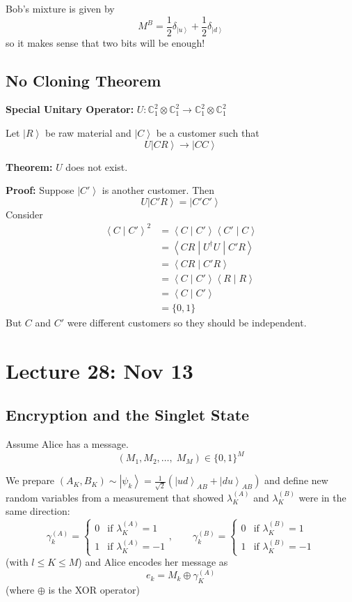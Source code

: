 \documentclass[12pt]{article}
\newcommand{\brak}[1]{\left\langle #1 \right\rangle}
\newcommand{\C}{\mathbb{C}}
\newcommand{\ket}[1]{\left\vert #1 \right\rangle}
\begin{document}
        Bob's mixture is given by 
        \[M^B = \frac{1}{2}\delta_{\ket{u}} + \frac{1}{2}\delta_{\ket{d}}\]
        so it makes sense that two bits will be enough!

    \subsection*{No Cloning Theorem}
        \textbf{Special Unitary Operator:} $U: \C_1^2 \otimes \C_1^2 \to \C_1^2 \otimes \C_1^2$
            
            Let $\ket{R}$ be raw material and $\ket{C}$ be a customer such that
            \[U\ket{CR} \to \ket{CC}\]

        \textbf{Theorem:} $U$ does not exist. 

        \textbf{Proof:} Suppose $\ket{C'}$ is another customer. Then 
        \[U\ket{C'R} = \ket{C'C'}\]
        Consider 
        \begin{align*}
            \brak{C \; | \; C'}^2 &= \brak{C \; | \; C'}\brak{C' \; | \; C}\\
            &= \brak{CR \; | \; U^\dagger U \; | \; C'R}\\
            &= \brak{CR \; | \;  C'R}\\
            &= \brak{C \; | \; C'}\brak{R \; | \; R}\\
            &= \brak{C \; | \; C'}\\
            &= \{0, 1\}
        \end{align*}
        But $C$ and $C'$ were different customers so they should be independent.

\section*{Lecture 28: Nov 13}
    \subsection*{Encryption and the Singlet State}
        Assume Alice has a message. 
        \[(M_1, M_2, \dots,\; M_M )\in \{0, 1\}^M \]

        We prepare $(A_K, B_K) \sim \ket{\psi_k} = \frac{1}{\sqrt 2}(\ket{ud}_{AB} + \ket{du}_{AB})$ and define new random variables from a measurement that showed $\lambda_K^{(A)}$ and $\lambda_K^{(B)}$ were in the same direction:
        \[\gamma_k^{(A)} = \begin{cases}
            0 & \text{if } \lambda_K^{(A)} = 1\\
            1 & \text{if } \lambda_K^{(A)} = -1
        \end{cases}, \qquad \gamma_k^{(B)} = \begin{cases}
            0 & \text{if } \lambda_K^{(B)} = 1\\
            1 & \text{if } \lambda_K^{(B)} = -1
        \end{cases}\]
        (with $l \leq K \leq M$) and Alice encodes her message as 
        \[e_k = M_k \oplus \gamma_K^{(A)}\]
        (where $\oplus$ is the XOR operator)
\end{document}
